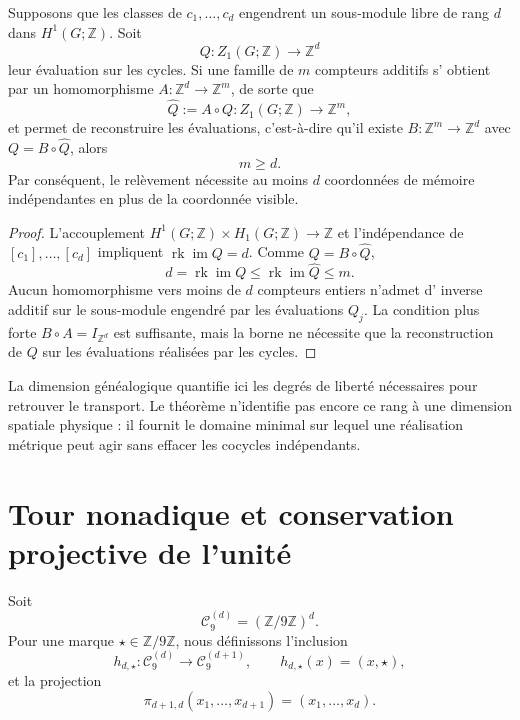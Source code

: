 \begin{theorem}
\label{thm:rango-dimensional-cohomologico-rev2}
Supposons que les classes de \(c_1,\ldots,c_d\) engendrent un sous-module libre de
rang \(d\) dans \(H^1(G;\mathbb Z)\). Soit
\[
 Q:Z_1(G;\mathbb Z)\longrightarrow\mathbb Z^d
\]
leur évaluation sur les cycles. Si une famille de \(m\) compteurs additifs s'
obtient par un homomorphisme \(A:\mathbb Z^d\to\mathbb Z^m\), de sorte
que
\[
 \widehat Q:=A\circ Q:Z_1(G;\mathbb Z)\longrightarrow\mathbb Z^m,
\]
et permet de reconstruire les évaluations, c'est-à-dire qu'il existe
\(B:\mathbb Z^m\to\mathbb Z^d\) avec
\(Q=B\circ\widehat Q\), alors
\[
 \boxed{m\geq d}.
\]
Par conséquent, le relèvement nécessite au moins \(d\) coordonnées de mémoire
indépendantes en plus de la coordonnée visible.
\end{theorem}

\begin{proof}
L'accouplement
\(H^1(G;\mathbb Z)\times H_1(G;\mathbb Z)\to\mathbb Z\) et l'indépendance
de \([c_1],\ldots,[c_d]\) impliquent
\(\operatorname{rk}\operatorname{im}Q=d\). Comme
\(Q=B\circ\widehat Q\),
\[
 d=\operatorname{rk}\operatorname{im}Q
 \leq\operatorname{rk}\operatorname{im}\widehat Q\leq m.
\]
Aucun homomorphisme vers moins de \(d\) compteurs entiers n'admet d'
inverse additif sur le sous-module engendré par les évaluations \(Q_j\).
La condition plus forte \(B\circ A=I_{\mathbb Z^d}\) est suffisante, mais la
borne ne nécessite que la reconstruction de \(Q\) sur les évaluations
réalisées par les cycles.
\end{proof}

La dimension généalogique quantifie ici les degrés de liberté nécessaires pour
retrouver le transport. Le théorème n'identifie pas encore ce rang à une
dimension spatiale physique : il fournit le domaine minimal sur lequel une
réalisation métrique peut agir sans effacer les cocycles indépendants.

\section{Tour nonadique et conservation projective de l'unité}

Soit
\[
 \mathcal C_9^{(d)}=(\mathbb Z/9\mathbb Z)^d.
\]
Pour une marque \(\star\in\mathbb Z/9\mathbb Z\), nous définissons l'inclusion
\[
 h_{d,\star}:\mathcal C_9^{(d)}\longrightarrow
 \mathcal C_9^{(d+1)},
 \qquad h_{d,\star}(x)=(x,\star),
\]
et la projection
\[
 \pi_{d+1,d}(x_1,\ldots,x_{d+1})=(x_1,\ldots,x_d).
\]

